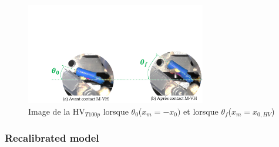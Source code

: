 \documentclass[3p,twocolumn,preprint]{elsarticle}
\begin{document}
\begin{figure}[!htbp]
	\begin{center}
		\captionsetup{justification=centering}
		\includegraphics[trim={4cm 0cm 0cm 9.5cm},clip,width=0.7\textwidth]{figures/contact_M_VH_lachers.pdf}
		\caption{Image de la HV$_{T100p}$ lorsque $\theta_0$($x_m=-x_{0})$ et lorsque $\theta_f$($x_m=x_{0,HV}$)}
		\label{fig:contact_M_VH_lachers}
	\end{center}
\end{figure}

	\subsubsection{Recalibrated model}
\end{document}
